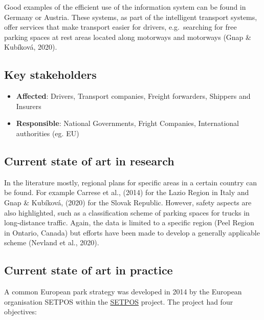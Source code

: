 \documentclass[
]{book}
\providecommand{\tightlist}{%
  \setlength{\itemsep}{0pt}\setlength{\parskip}{0pt}}
\begin{document}
Good examples of the efficient use of the information system can be found in Germany or Austria. These systems, as part of the intelligent transport systems, offer services that make transport easier for drivers, e.g.~searching for free parking spaces at rest areas located along motorways and motorways (Gnap \& Kubíková, 2020).

\hypertarget{key-stakeholders-31}{%
\subsection*{Key stakeholders}\label{key-stakeholders-31}}

\begin{itemize}
\tightlist
\item
  \textbf{Affected}: Drivers, Transport companies, Freight forwarders, Shippers and Insurers
\item
  \textbf{Responsible}: National Governments, Fright Companies, International authorities (eg. EU)
\end{itemize}

\hypertarget{current-state-of-art-in-research-31}{%
\subsection*{Current state of art in research}\label{current-state-of-art-in-research-31}}

In the literature mostly, regional plans for specific areas in a certain country can be found. For example Carrese et al., (2014) for the Lazio Region in Italy and Gnap \& Kubíková, (2020) for the Slovak Republic. However, safety aspects are also highlighted, such as a classification scheme of parking spaces for trucks in long-distance traffic. Again, the data is limited to a specific region (Peel Region in Ontario, Canada) but efforts have been made to develop a generally applicable scheme (Nevland et al., 2020).

\hypertarget{current-state-of-art-in-practice-31}{%
\subsection*{Current state of art in practice}\label{current-state-of-art-in-practice-31}}

A common European park strategy was developed in 2014 by the European organisation SETPOS within the \href{https://ec.europa.eu/transport/sites/transport/files/modes/road/parking/doc/2010_04_28_setpos_project_handbook.pdf}{SETPOS} project. The project had four objectives:
\end{document}
